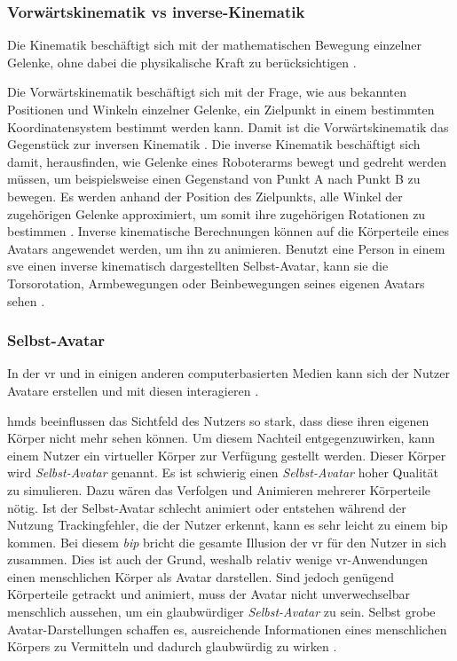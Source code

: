 \documentclass[a4paper,11pt]{article}%
\renewcommand{\\}{\vspace*{0.5\baselineskip} \newline}
\begin{document}
\subsubsection{Vorwärtskinematik vs inverse-Kinematik}
Die Kinematik beschäftigt sich mit der mathematischen Bewegung einzelner Gelenke, ohne dabei die physikalische Kraft zu berücksichtigen \citep[S.1]{beggs1983kinematics}.

Die Vorwärtskinematik beschäftigt sich mit der Frage, wie aus bekannten Positionen und Winkeln einzelner Gelenke, ein Zielpunkt in einem bestimmten Koordinatensystem bestimmt werden kann. Damit ist die Vorwärtskinematik das Gegenstück zur inversen Kinematik \citep[S.119]{kucuk2006robot}.
\label{inverseKinematik}
Die inverse Kinematik beschäftigt sich damit, herausfinden, wie Gelenke eines Roboterarms bewegt und gedreht werden müssen, um beispielsweise einen Gegenstand von Punkt A nach Punkt B zu bewegen. Es werden anhand der Position des Zielpunkts, alle Winkel der zugehörigen Gelenke approximiert, um somit ihre zugehörigen Rotationen zu bestimmen \citep[S.299-300]{d2001learning}. Inverse kinematische Berechnungen können auf die Körperteile eines Avatars angewendet werden, um ihn zu animieren. Benutzt eine Person in einem \ac{sve} einen inverse kinematisch dargestellten Selbst-Avatar, kann sie die Torsorotation, Armbewegungen oder Beinbewegungen seines eigenen Avatars sehen \citep[S.1]{kim2018real}.

\subsubsection{Selbst-Avatar}

In der \ac{vr} und in einigen anderen computerbasierten Medien kann sich der Nutzer Avatare erstellen und mit diesen interagieren \citep[S.1]{neustaedter2009presenting}.

\ac{hmd}s beeinflussen das Sichtfeld des Nutzers so stark, dass diese ihren eigenen Körper nicht mehr sehen können. Um diesem Nachteil entgegenzuwirken, kann einem Nutzer ein virtueller Körper zur Verfügung gestellt werden. Dieser Körper wird \textit{Selbst-Avatar} genannt.
Es ist schwierig einen \textit{Selbst-Avatar} hoher Qualität zu simulieren. Dazu wären das Verfolgen und Animieren mehrerer Körperteile nötig. Ist der Selbst-Avatar schlecht animiert oder entstehen während der Nutzung Trackingfehler, die der Nutzer erkennt, kann es sehr leicht zu einem \ac{bip} kommen. Bei diesem \textit{\ac{bip}} bricht die gesamte Illusion der \ac{vr} für den Nutzer in sich zusammen. 
Dies ist auch der Grund, weshalb relativ wenige \ac{vr}-Anwendungen einen menschlichen Körper als Avatar darstellen.
Sind jedoch genügend Körperteile getrackt und animiert, muss der Avatar nicht unverwechselbar menschlich aussehen, um ein glaubwürdiger \textit{Selbst-Avatar} zu sein. Selbst grobe Avatar-Darstellungen schaffen es, ausreichende Informationen eines menschlichen Körpers zu Vermitteln und dadurch glaubwürdig zu wirken \citep{lok2003effects}.
\end{document}
